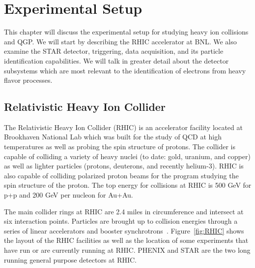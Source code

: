\chapter{Experimental Setup}

This chapter will discuss the experimental setup for studying heavy ion collisions and QGP. We will start by describing the RHIC accelerator at BNL. We also examine the STAR detector, triggering, data acquisition, and its particle identification capabilities. We will talk in greater detail about the detector subsystems which are most relevant to the identification of electrons from heavy flavor processes. 

\section{Relativistic Heavy Ion Collider}

The Relativistic Heavy Ion Collider (RHIC) is an accelerator facility located at Brookhaven National Lab which was built for the study of QCD at high temperatures as well as probing the spin structure of protons. The collider is capable of colliding a variety of heavy nuclei (to date: gold, uranium, and copper) as well as lighter particles (protons, deuterons, and recently helium-3). RHIC is also capable of colliding polarized proton beams for the program studying the spin structure of the proton. The top energy for collisions at RHIC is 500 GeV for p+p and 200 GeV per nucleon for Au+Au. 

The main collider rings at RHIC are 2.4 miles in circumference and intersect at six interaction points. Particles are brought up to collision energies through a series of linear accelerators and booster synchrotrons~\cite{RHICacc}. Figure~\ref{fig:RHIC} shows the layout of the RHIC facilities as well as the location of some experiments that have run or are currently running at RHIC. PHENIX and STAR are the two long running general purpose detectors at RHIC.

